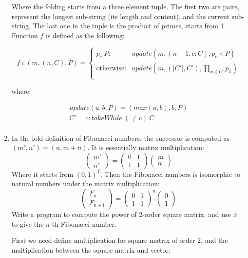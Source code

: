\documentclass[UTF8]{article}
\begin{document}
\begin{enumerate}
Where the folding starts from a three element tuple. The first two are pairs, represent the longest sub-string (its length and content), and the current sub-string. The last one in the tuple is the product of primes, starts from 1. Function $f$ is defined as the following:

\[
f\ c\ (m, (n, C), P) = \begin{cases}
  p_c | P : & update(m, (n + 1, c : C), p_c \times P) \\
  \text{otherwise}: & update(m, (|C'|, C'), \displaystyle \prod_{x \in C'} p_x) \\
\end{cases}
\]

where:

\[ \begin{array}{l}
update(a, b, P) = (max(a, b), b, P) \\
C' = c : takeWhile\ (\neq c)\ C \\
\end{array} \]

\item {In the fold definition of Fibonacci numbers, the successor is computed as $(m', n') = (n, m + n)$. It is essentially matrix multiplication:
\[
\begin{pmatrix} m' \\ n' \end{pmatrix} =
\begin{pmatrix} 0 & 1 \\ 1 & 1 \end{pmatrix}
\begin{pmatrix} m \\ n \end{pmatrix}
\]
Where it starts from $(0, 1)^T$. Then the Fibonacci numbers is isomorphic to natural numbers under the matrix multiplication:
\[
\begin{pmatrix}F_n \\ F_{n+1} \end{pmatrix} = \begin{pmatrix} 0 & 1 \\ 1 & 1 \end{pmatrix}^n\begin{pmatrix} 0 \\ 1 \end{pmatrix}
\]
Write a program to compute the power of 2-order square matrix, and use it to give the $n$-th Fibonacci number.}

First we need define multiplication for square matrix of order 2, and the multiplication between the square matrix and vector:


\end{enumerate}
\end{document}
